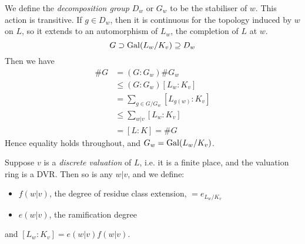 \documentclass[10pt,a4paper]{article}
\begin{document}
We define the \emph{decomposition group} $D_w$ or $G_w$ to be the stabiliser of $w$. This action is transitive. If $g \in D_w$, then it is continuous for the topology induced by $w$ on $L$, so it extends to an automorphism of $L_w$, the completion of $L$ at $w$.
\[G \supset\operatorname{Gal}(L_w/K_v) \supseteq D_w\]
Then we have
\begin{align*}
  \#G &= (G:G_w)\#G_w\\
  &\leq (G:G_w)[L_w:K_v]\\
  &= \sum_{g \in G/G_w} [L_{g(w)}:K_v]\\
  &\leq \sum_{w|v}[L_w:K_v]\\
  &= [L:K] = \#G
\end{align*}
Hence equality holds throughout, and $G_w = \operatorname{Gal}(L_w/K_v)$.

Suppose $v$ is a \emph{discrete valuation} of $L$, i.e. it is a finite place, and the valuation ring is a DVR. Then so is any $w|v$, and we define:
\begin{itemize}
  \item $f(w|v)$, the degree of residue class extension, $= e_{L_w/K_v}$
  \item $e(w|v)$, the ramification degree
\end{itemize}
and $[L_w:K_v] = e(w|v)f(w|v)$.
\end{document}
